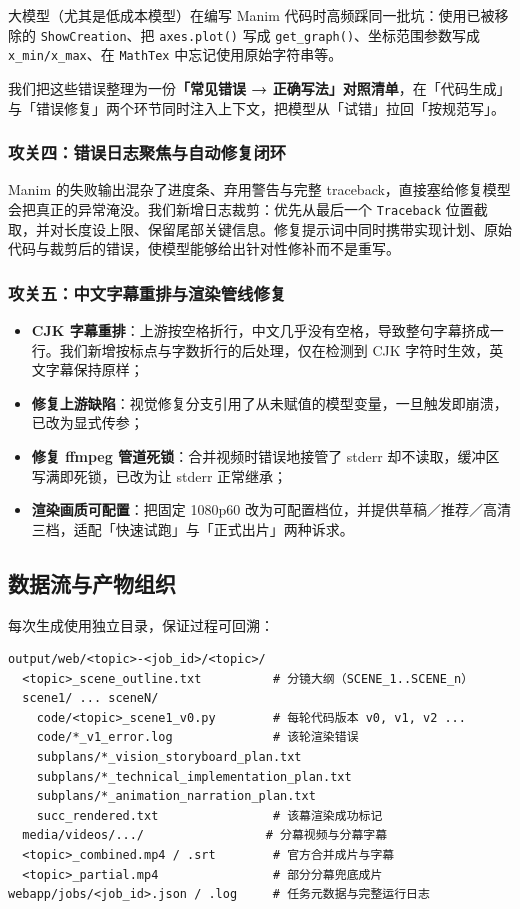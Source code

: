 \documentclass[11pt,a4paper]{ctexart}
\begin{document}
大模型（尤其是低成本模型）在编写 Manim 代码时高频踩同一批坑：使用已被移除的 \texttt{ShowCreation}、把 \texttt{axes.plot()} 写成 \texttt{get\_graph()}、坐标范围参数写成 \texttt{x\_min/x\_max}、在 \texttt{MathTex} 中忘记使用原始字符串等。

我们把这些错误整理为一份\textbf{「常见错误 → 正确写法」对照清单}，在「代码生成」与「错误修复」两个环节同时注入上下文，把模型从「试错」拉回「按规范写」。

\subsubsection{攻关四：错误日志聚焦与自动修复闭环}

Manim 的失败输出混杂了进度条、弃用警告与完整 traceback，直接塞给修复模型会把真正的异常淹没。我们新增日志裁剪：优先从最后一个 \texttt{Traceback} 位置截取，并对长度设上限、保留尾部关键信息。修复提示词中同时携带实现计划、原始代码与裁剪后的错误，使模型能够给出针对性修补而不是重写。

\subsubsection{攻关五：中文字幕重排与渲染管线修复}

\begin{itemize}
  \item \textbf{CJK 字幕重排}：上游按空格折行，中文几乎没有空格，导致整句字幕挤成一行。我们新增按标点与字数折行的后处理，仅在检测到 CJK 字符时生效，英文字幕保持原样；
  \item \textbf{修复上游缺陷}：视觉修复分支引用了从未赋值的模型变量，一旦触发即崩溃，已改为显式传参；
  \item \textbf{修复 ffmpeg 管道死锁}：合并视频时错误地接管了 stderr 却不读取，缓冲区写满即死锁，已改为让 stderr 正常继承；
  \item \textbf{渲染画质可配置}：把固定 1080p60 改为可配置档位，并提供草稿／推荐／高清三档，适配「快速试跑」与「正式出片」两种诉求。
\end{itemize}

\subsection{数据流与产物组织}

每次生成使用独立目录，保证过程可回溯：

\begin{lstlisting}
output/web/<topic>-<job_id>/<topic>/
  <topic>_scene_outline.txt          # 分镜大纲（SCENE_1..SCENE_n）
  scene1/ ... sceneN/
    code/<topic>_scene1_v0.py        # 每轮代码版本 v0, v1, v2 ...
    code/*_v1_error.log              # 该轮渲染错误
    subplans/*_vision_storyboard_plan.txt
    subplans/*_technical_implementation_plan.txt
    subplans/*_animation_narration_plan.txt
    succ_rendered.txt                # 该幕渲染成功标记
  media/videos/.../                 # 分幕视频与分幕字幕
  <topic>_combined.mp4 / .srt        # 官方合并成片与字幕
  <topic>_partial.mp4                # 部分分幕兜底成片
webapp/jobs/<job_id>.json / .log     # 任务元数据与完整运行日志
\end{lstlisting}
\end{document}
